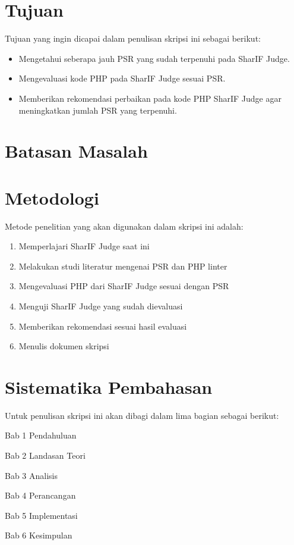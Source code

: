 
\section{Tujuan}
\label{sec:tujuan}
Tujuan yang ingin dicapai dalam penulisan skripsi ini sebagai berikut:
\begin{itemize}
	\item Mengetahui seberapa jauh PSR yang sudah terpenuhi pada SharIF Judge.
	\item Mengevaluasi kode PHP pada SharIF Judge sesuai PSR.
	\item Memberikan rekomendasi perbaikan pada kode PHP SharIF Judge agar meningkatkan jumlah PSR yang terpenuhi.
\end{itemize}


\section{Batasan Masalah}
\label{sec:batasan}



\section{Metodologi}
\label{sec:metlit}
Metode penelitian yang akan digunakan dalam skripsi ini adalah:
\begin{enumerate}
	\item Memperlajari SharIF Judge saat ini
	\item Melakukan studi literatur mengenai PSR dan PHP linter
	\item Mengevaluasi PHP dari SharIF Judge sesuai dengan PSR
	\item Menguji SharIF Judge yang sudah dievaluasi
	\item Memberikan rekomendasi sesuai hasil evaluasi
	\item Menulis dokumen skripsi
\end{enumerate}


\section{Sistematika Pembahasan}
\label{sec:sispem}
Untuk penulisan skripsi ini akan dibagi dalam lima bagian sebagai berikut:

Bab 1 Pendahuluan

Bab 2 Landasan Teori 

Bab 3 Analisis

Bab 4 Perancangan

Bab 5 Implementasi

Bab 6 Kesimpulan

